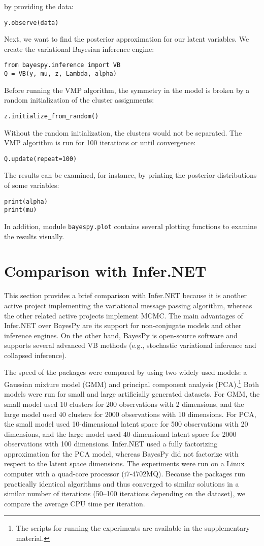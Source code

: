 \documentclass[twoside,11pt]{article}
\begin{document}
by providing the data:
\begin{lstlisting}
y.observe(data)
\end{lstlisting}
Next, we want to find the posterior approximation for our latent variables.  We
create the variational Bayesian inference engine:
\begin{lstlisting}
from bayespy.inference import VB
Q = VB(y, mu, z, Lambda, alpha)
\end{lstlisting}
Before running the VMP algorithm, the symmetry in the model is broken by
a random initialization of the cluster assignments:
\begin{lstlisting}
z.initialize_from_random()
\end{lstlisting}
Without the random initialization, the clusters would not be separated.  The VMP
algorithm is run for 100 iterations or until convergence:
\begin{lstlisting}
Q.update(repeat=100)
\end{lstlisting}
The results can be examined, for instance, by printing the posterior
distributions of some variables:
\begin{lstlisting}
print(alpha)
print(mu)
\end{lstlisting}
In addition, module \texttt{bayespy.plot} contains several plotting functions to
examine the results visually.


\section{Comparison with Infer.NET}


This section provides a brief comparison with Infer.NET because it is another
active project implementing the variational message passing algorithm, whereas
the other related active projects implement MCMC.  The main advantages of
Infer.NET over BayesPy are its support for non-conjugate models and other
inference engines.  On the other hand, BayesPy is open-source software and
supports several advanced VB methods (e.g., stochastic variational inference and
collapsed inference).


The speed of the packages were compared by using two widely used models: a
Gaussian mixture model (GMM) and principal component analysis
(PCA).\footnote{The scripts for running the experiments are available in the
  supplementary material.}  Both models were run for small and large
artificially generated datasets.  For GMM, the small model used 10 clusters for
200 observations with 2 dimensions, and the large model used 40 clusters for
2000 observations with 10 dimensions.  For PCA, the small model used
10-dimensional latent space for 500 observations with 20 dimensions, and the
large model used 40-dimensional latent space for 2000 observations with 100
dimensions.  Infer.NET used a fully factorizing approximation for the PCA model,
whereas BayesPy did not factorize with respect to the latent space dimensions.
The experiments were run on a Linux computer with a quad-core processor
(i7-4702MQ).  Because the packages run practically identical algorithms and thus
converged to similar solutions in a similar number of iterations (50--100
iterations depending on the dataset), we compare the average CPU time per
iteration.
\end{document}
